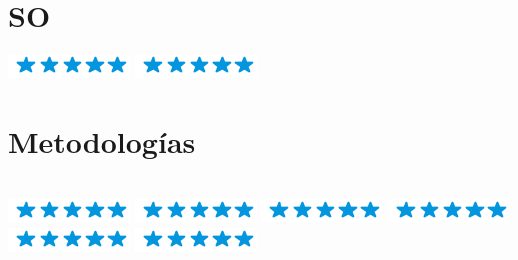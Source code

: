 \documentclass[]{cv-class}
\begin{document}
\begin{aside}
	\section{SO}
	{\includegraphics[scale=0.40]{img/5stars.png}}
	{\includegraphics[scale=0.40]{img/5stars.png}}

	\section{Metodologías} \\
	{\includegraphics[scale=0.40]{img/5stars.png}}
	{\includegraphics[scale=0.40]{img/5stars.png}}
	{\includegraphics[scale=0.40]{img/5stars.png}}
	{\includegraphics[scale=0.40]{img/5stars.png}}
	{\includegraphics[scale=0.40]{img/5stars.png}}
	{\includegraphics[scale=0.40]{img/5stars.png}}


\end{aside}
\end{document}
